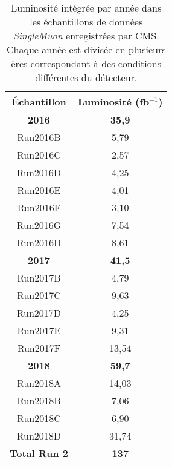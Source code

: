 \begin{table}[!ht]
\centering
\begin{tabular}{|c|c|}
\hline
Échantillon    & Luminosité (fb$^{-1}$) \\ \hline \hline
\textbf{2016}  & \textbf{35,9}          \\ \hline
Run2016B       & 5,79                   \\
Run2016C       & 2,57                   \\
Run2016D       & 4,25                   \\
Run2016E       & 4,01                   \\
Run2016F       & 3,10                   \\
Run2016G       & 7,54                   \\
Run2016H       & 8,61                   \\ \hline \hline
\textbf{2017}  & \textbf{41,5}          \\ \hline 
Run2017B       & 4,79                   \\
Run2017C       & 9,63                   \\
Run2017D       & 4,25                   \\
Run2017E       & 9,31                   \\
Run2017F       & 13,54                  \\ \hline \hline
\textbf{2018}  & \textbf{59,7}          \\ \hline
Run2018A       & 14,03                  \\
Run2018B       & 7,06                   \\
Run2018C       & 6,90                   \\
Run2018D       & 31,74                  \\ \hline \hline
\textbf{Total Run 2} & \textbf{137}           \\ \hline 
\end{tabular}
\caption{Luminosité intégrée par année dans les échantillons de données \textit{SingleMuon} enregistrées par CMS. Chaque année est divisée en plusieurs ères correspondant à des conditions différentes du détecteur.}
\label{lumiData}
\end{table}